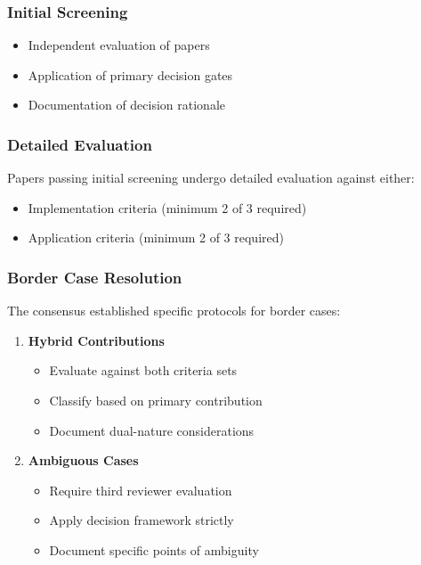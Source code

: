 \documentclass[a4paper,12pt]{article}
\begin{document}
\begin{enumerate}
\subsubsection{Initial Screening}
\begin{itemize}
    \item Independent evaluation of papers
    \item Application of primary decision gates
    \item Documentation of decision rationale
\end{itemize}

\subsubsection{Detailed Evaluation}
Papers passing initial screening undergo detailed evaluation against either:
\begin{itemize}
    \item Implementation criteria (minimum 2 of 3 required)
    \item Application criteria (minimum 2 of 3 required)
\end{itemize}

\subsubsection{Border Case Resolution}
The consensus established specific protocols for border cases:

\begin{enumerate}
    \item \textbf{Hybrid Contributions}
    \begin{itemize}
        \item Evaluate against both criteria sets
        \item Classify based on primary contribution
        \item Document dual-nature considerations
    \end{itemize}
    
    \item \textbf{Ambiguous Cases}
    \begin{itemize}
        \item Require third reviewer evaluation
        \item Apply decision framework strictly
        \item Document specific points of ambiguity
    \end{itemize}
    

\end{enumerate}
\end{enumerate}
\end{document}
